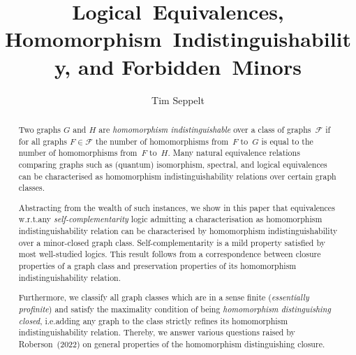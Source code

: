 \documentclass[3p,final]{elsarticle}
\begin{document}
	\begin{frontmatter}
		\title{Logical~Equivalences, Homomorphism~Indistinguishability, and Forbidden~Minors} 

		\author[1]{Tim Seppelt}
		
		
	
	\begin{abstract}
		Two graphs $G$ and $H$ are \emph{homomorphism indistinguishable} over a class of graphs~$\mathcal{F}$ if for all graphs $F \in \mathcal{F}$ the number of homomorphisms from~$F$ to~$G$ is equal to the number of homomorphisms from~$F$ to~$H$.
		Many natural equivalence relations comparing graphs such as (quantum) isomorphism, spectral, and logical equivalences can be characterised as homomorphism indistinguishability relations over certain graph classes.
		
		Abstracting from the wealth of such instances, we show in this paper that equivalences w.r.t.\@ any \emph{self-complementarity} logic admitting a characterisation as homomorphism indistinguishability relation can be characterised by homomorphism indistinguishability over a minor-closed graph class.
		Self-complementarity is a mild property satisfied by most well-studied logics.
		This result follows from a correspondence between closure properties of a graph class and preservation properties of its homomorphism indistinguishability relation.
		
		Furthermore, we classify all graph classes which are in a sense finite (\emph{essentially profinite}) and satisfy the maximality condition of being \emph{homomorphism distinguishing closed}, i.e.\@ adding any graph to the class strictly refines its homomorphism indistinguishability relation.
		Thereby, we answer various questions raised by Roberson~(2022) on general properties of the homomorphism distinguishing closure.
\end{abstract}
	
	\end{frontmatter}
\end{document}
